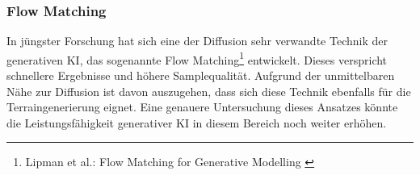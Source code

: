 \subsubsection{Flow Matching}

In jüngster Forschung hat sich eine der Diffusion sehr verwandte Technik der generativen \ac{KI}, das sogenannte Flow Matching\footnote{
    Lipman et al.: Flow Matching for Generative Modelling
    \cite{lipman2023flowmatchinggenerativemodeling}
} entwickelt. Dieses verspricht schnellere Ergebnisse und höhere Samplequalität. Aufgrund der unmittelbaren Nähe zur Diffusion ist davon auszugehen, dass sich diese Technik ebenfalls für die Terraingenerierung eignet. Eine genauere Untersuchung dieses Ansatzes könnte die Leistungsfähigkeit generativer \ac{KI} in diesem Bereich noch weiter erhöhen.  